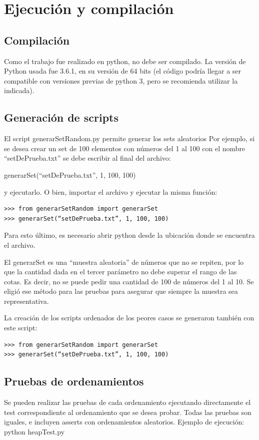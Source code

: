 \documentclass[article,a4paper]{article}
\begin{document}
\appendix
\section{Ejecución y compilación}

\subsection{Compilación}
Como el trabajo fue realizado en python, no debe ser compilado. La versión de Python usada fue 3.6.1, en su versión de 64 bits (el código podría llegar a ser compatible con versiones previas de python 3, pero se recomienda utilizar la indicada).

\subsection{Generación de scripts}
El script generarSetRandom.py permite generar los sets aleatorios Por ejemplo, si se desea crear un set de 100 elementos con números del 1 al 100 con el nombre “setDePrueba.txt” se debe escribir al final del archivo:

generarSet(“setDePrueba.txt”, 1, 100, 100)

y ejecutarlo. O bien, importar el archivo y ejecutar la misma función:

\begin{verbatim}
>>> from generarSetRandom import generarSet
>>> generarSet(“setDePrueba.txt”, 1, 100, 100)
\end{verbatim}

Para esto último, es necesario abrir python desde la ubicación donde se encuentra el archivo.

El generarSet es una “muestra aleatoria” de números que no se repiten,  por lo que la cantidad dada en el tercer parámetro no debe superar el rango de las cotas. Es decir, no se puede pedir una cantidad de 100 de números del 1 al 10. Se eligió ese método para las pruebas para asegurar que siempre la muestra sea representativa. 

La creación de los scripts ordenados de los peores casos se generaron también con este script:
\begin{verbatim}
>>> from generarSetRandom import generarSet
>>> generarSet(“setDePrueba.txt”, 1, 100, 100)
\end{verbatim}

\subsection{Pruebas de ordenamientos}
Se pueden realizar las pruebas de cada ordenamiento ejecutando directamente el test correspondiente al ordenamiento que se desea probar. Todas las pruebas son iguales, e incluyen asserts con ordenamientos aleatorios.
Ejemplo de ejecución: python heapTest.py
\end{document}

